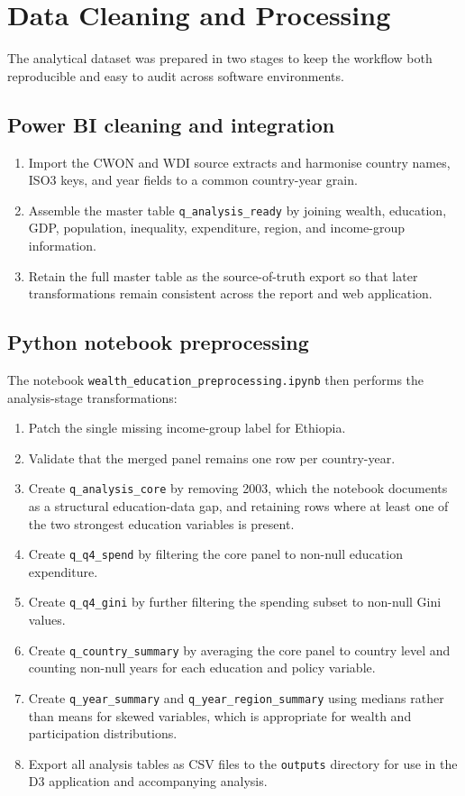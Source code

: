 \documentclass{vgtc}
\begin{document}
\section{Data Cleaning and Processing}
\small
The analytical dataset was prepared in two stages to keep the workflow both reproducible and easy to audit across software environments.

\subsection*{Power BI cleaning and integration}
\begin{enumerate}[leftmargin=*]
  \item Import the CWON and WDI source extracts and harmonise country names, ISO3 keys, and year fields to a common country-year grain.
  \item Assemble the master table \texttt{q\_analysis\_ready} by joining wealth, education, GDP, population, inequality, expenditure, region, and income-group information.
  \item Retain the full master table as the source-of-truth export so that later transformations remain consistent across the report and web application.
\end{enumerate}

\subsection*{Python notebook preprocessing}
The notebook \texttt{wealth\_education\_preprocessing.ipynb} then performs the analysis-stage transformations:
\begin{enumerate}[leftmargin=*]
  \item Patch the single missing income-group label for Ethiopia.
  \item Validate that the merged panel remains one row per country-year.
  \item Create \texttt{q\_analysis\_core} by removing 2003, which the notebook documents as a structural education-data gap, and retaining rows where at least one of the two strongest education variables is present.
  \item Create \texttt{q\_q4\_spend} by filtering the core panel to non-null education expenditure.
  \item Create \texttt{q\_q4\_gini} by further filtering the spending subset to non-null Gini values.
  \item Create \texttt{q\_country\_summary} by averaging the core panel to country level and counting non-null years for each education and policy variable.
  \item Create \texttt{q\_year\_summary} and \texttt{q\_year\_region\_summary} using medians rather than means for skewed variables, which is appropriate for wealth and participation distributions.
  \item Export all analysis tables as CSV files to the \texttt{outputs} directory for use in the D3 application and accompanying analysis.
\end{enumerate}
\FloatBarrier
\end{document}
